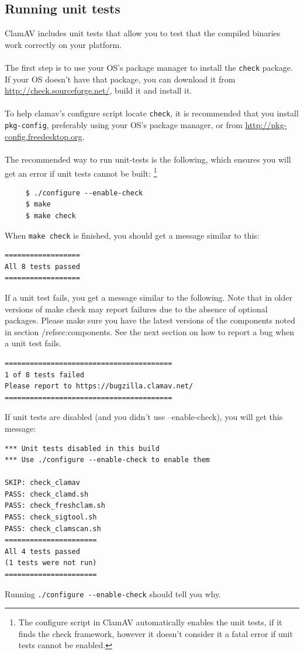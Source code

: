 \documentclass[a4paper,titlepage,12pt]{article}
\begin{document}
    \subsection{Running unit tests}\label{unit-testing}
	ClamAV includes unit tests that allow you to test that the compiled binaries work correctly on your platform.
        \\\\
	The first step is to use your OS's package manager to install the \verb+check+ package. 
	If your OS doesn't have that package, you can download it from \url{http://check.sourceforge.net/}, 
	build it and install it.
        \\\\
	To help clamav's configure script locate \verb+check+, it is recommended that you install \verb+pkg-config+, preferably
	using your OS's package manager, or from \url{http://pkg-config.freedesktop.org}.
        \\\\
	The recommended way to run unit-tests is the following, which ensures you will get an error if unit tests cannot be built:
	\footnote{The configure script in ClamAV automatically enables the unit tests, if it finds the check framework, however it doesn't consider it a fatal error if unit tests cannot be enabled.}
	\begin{verbatim}
	 $ ./configure --enable-check
	 $ make
	 $ make check
	\end{verbatim}
	When \verb+make check+ is finished, you should get a message similar to this:
	\begin{verbatim}
==================
All 8 tests passed
==================
	\end{verbatim}
	If a unit test fails, you get a message similar to the following.
        Note that in older versions of make check may report failures due to
        the absence of optional packages. Please make sure you have the
        latest versions of the components noted in section /ref{sec:components}.
	See the next section on how to report a bug when a unit test fails.
	\begin{verbatim}
========================================
1 of 8 tests failed
Please report to https://bugzilla.clamav.net/
========================================
	\end{verbatim}
	If unit tests are disabled (and you didn't use --enable-check), you will get this message:
	\begin{verbatim}
*** Unit tests disabled in this build
*** Use ./configure --enable-check to enable them

SKIP: check_clamav
PASS: check_clamd.sh
PASS: check_freshclam.sh
PASS: check_sigtool.sh
PASS: check_clamscan.sh
======================
All 4 tests passed
(1 tests were not run)
======================
	\end{verbatim}
	Running \verb+./configure --enable-check+ should tell you why.
\end{document}
